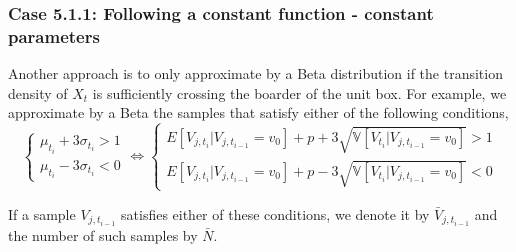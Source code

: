 \documentclass[aspectratio=169]{beamer}\usepackage[utf8]{inputenc}
\newcommand{\E}{\mathbb{E}}
\newcommand{\V}{\mathbb{V}}
\begin{document}
\begin{frame}\frametitle{ Case 5.1.1: Following a constant function - constant parameters }
Another approach is to only approximate by a Beta distribution if the transition density of $X_t$ is sufficiently crossing the boarder of the unit box. For example, we approximate by a Beta the samples that satisfy either of the following conditions,
\begin{equation}
\begin{cases}
\mu_{t_i} + 3 \sigma_{t_i} >1\\
\mu_{t_i} - 3 \sigma_{t_i} <0
\end{cases} \iff
\begin{cases}
E[V_{j,t_i}| V_{j,t_{i-1}}=v_0] + p + 3 \sqrt{\V[V_{t_i}| V_{j,t_{i-1}}=v_0]} >1\\
E[V_{j,t_i}| V_{j,t_{i-1}}=v_0]+p - 3 \sqrt{\V[V_{t_i}| V_{j,t_{i-1}}=v_0]} <0
\end{cases}
\end{equation}

If a sample $V_{j,t_{i-1}}$ satisfies either of these conditions, we denote it by $\bar{V}_{j,t_{i-1}}$ and the number of such samples by $\bar{N}$.



%
\end{frame}
\end{document}

